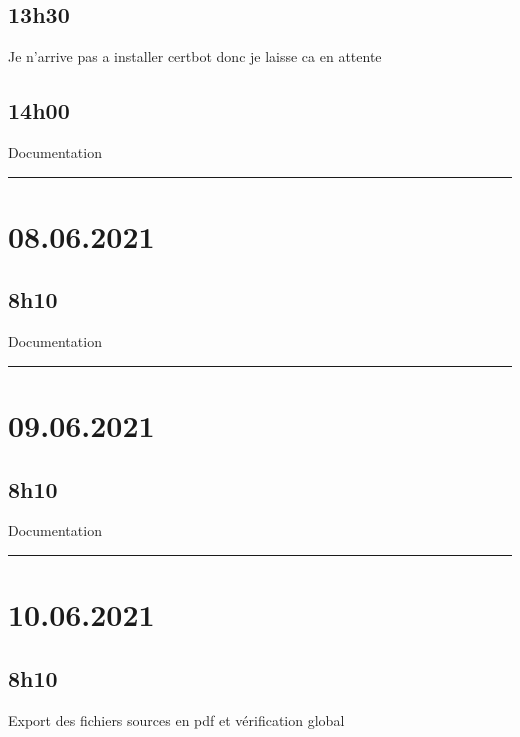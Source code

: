 \documentclass[a4paper,12pt,french]{sphinxmanual}
\begin{document}
\subsection{13h30}
\label{\detokenize{logbook:id194}}
\sphinxAtStartPar
Je n’arrive pas a installer certbot donc je laisse ca en attente


\subsection{14h00}
\label{\detokenize{logbook:id195}}
\sphinxAtStartPar
Documentation


\bigskip\hrule\bigskip



\section{08.06.2021}
\label{\detokenize{logbook:id196}}

\subsection{8h10}
\label{\detokenize{logbook:id197}}
\sphinxAtStartPar
Documentation


\bigskip\hrule\bigskip



\section{09.06.2021}
\label{\detokenize{logbook:id198}}

\subsection{8h10}
\label{\detokenize{logbook:id199}}
\sphinxAtStartPar
Documentation


\bigskip\hrule\bigskip



\section{10.06.2021}
\label{\detokenize{logbook:id200}}

\subsection{8h10}
\label{\detokenize{logbook:id201}}
\sphinxAtStartPar
Export des fichiers sources en pdf et vérification global



\renewcommand{\indexname}{Index}
\printindex
\end{document}
